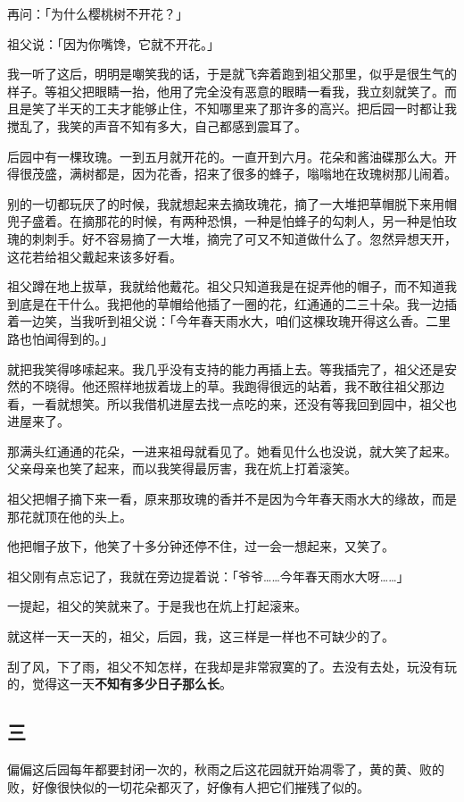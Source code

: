 \documentclass[UTF8]{ctexart}
\begin{document}
再问：「为什么樱桃树不开花？」

祖父说：「因为你嘴馋，它就不开花。」

我一听了这后，明明是嘲笑我的话，于是就飞奔着跑到祖父那里，似乎是很生气的样子。等祖父把眼睛一抬，他用了完全没有恶意的眼睛一看我，我立刻就笑了。而且是笑了半天的工夫才能够止住，不知哪里来了那许多的高兴。把后园一时都让我搅乱了，我笑的声音不知有多大，自己都感到震耳了。

后园中有一棵玫瑰。一到五月就开花的。一直开到六月。花朵和酱油碟那么大。开得很茂盛，满树都是，因为花香，招来了很多的蜂子，嗡嗡地在玫瑰树那儿闹着。

别的一切都玩厌了的时候，我就想起来去摘玫瑰花，摘了一大堆把草帽脱下来用帽兜子盛着。在摘那花的时候，有两种恐惧，一种是怕蜂子的勾刺人，另一种是怕玫瑰的刺刺手。好不容易摘了一大堆，摘完了可又不知道做什么了。忽然异想天开，这花若给祖父戴起来该多好看。

祖父蹲在地上拔草，我就给他戴花。祖父只知道我是在捉弄他的帽子，而不知道我到底是在干什么。我把他的草帽给他插了一圈的花，红通通的二三十朵。我一边插着一边笑，当我听到祖父说：「今年春天雨水大，咱们这棵玫瑰开得这么香。二里路也怕闻得到的。」

就把我笑得哆嗦起来。我几乎没有支持的能力再插上去。等我插完了，祖父还是安然的不晓得。他还照样地拔着垅上的草。我跑得很远的站着，我不敢往祖父那边看，一看就想笑。所以我借机进屋去找一点吃的来，还没有等我回到园中，祖父也进屋来了。

那满头红通通的花朵，一进来祖母就看见了。她看见什么也没说，就大笑了起来。父亲母亲也笑了起来，而以我笑得最厉害，我在炕上打着滚笑。

祖父把帽子摘下来一看，原来那玫瑰的香并不是因为今年春天雨水大的缘故，而是那花就顶在他的头上。

他把帽子放下，他笑了十多分钟还停不住，过一会一想起来，又笑了。

祖父刚有点忘记了，我就在旁边提着说：「爷爷……今年春天雨水大呀……」

一提起，祖父的笑就来了。于是我也在炕上打起滚来。

就这样一天一天的，祖父，后园，我，这三样是一样也不可缺少的了。

刮了风，下了雨，祖父不知怎样，在我却是非常寂寞的了。去没有去处，玩没有玩的，觉得这一天\textbf{不知有多少日子那么长}。

\subsection{三}

偏偏这后园每年都要封闭一次的，秋雨之后这花园就开始凋零了，黄的黄、败的败，好像很快似的一切花朵都灭了，好像有人把它们摧残了似的。
\end{document}
